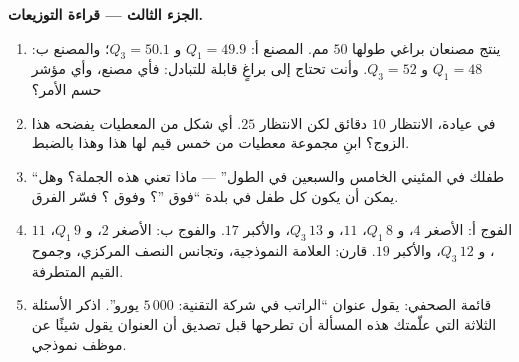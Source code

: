 \begin{problem}
\medskip
\noindent\textbf{الجزء الثالث --- قراءة التوزيعات.}
\begin{enumerate}[resume]
  \item ينتج مصنعان براغي  طولها
        $50$ مم. المصنع أ: $Q_1 = 49.9$ و $Q_3 = 50.1$؛ والمصنع
        ب: $Q_1 = 48$ و $Q_3 = 52$. وأنت تحتاج إلى براغٍ قابلة
        للتبادل: فأي مصنع، وأي مؤشر حسم الأمر؟
  \item في عيادة، الانتظار  $10$ دقائق لكن
        الانتظار  $25$. أي شكل من المعطيات يفضحه هذا
        الزوج؟ ابنِ مجموعة معطيات من خمس قيم لها هذا
         وهذا  بالضبط.
  \item ``طفلك في المئيني الخامس والسبعين في الطول'' ---
        ماذا تعني هذه الجملة؟ وهل يمكن أن يكون كل طفل في
        بلدة ``فوق ''؟ وفوق ؟ فسّر
        الفرق.
  \item الفوج أ: الأصغر $4$، و $Q_1\,8$،  $11$، و $Q_3\,13$، والأكبر
        $17$. والفوج ب: الأصغر $2$، و $Q_1\,9$،  $11$، و $Q_3\,12$،
        والأكبر $19$. قارن: العلامة النموذجية، وتجانس
        النصف المركزي، وجموح القيم المتطرفة.
  \item قائمة الصحفي: يقول عنوان ``الراتب
         في شركة التقنية: $5\,000$ يورو''. اذكر الأسئلة الثلاثة
        التي علّمتك هذه المسألة أن تطرحها قبل
        تصديق أن العنوان يقول شيئًا عن موظف نموذجي.
\end{enumerate}


\end{problem}
